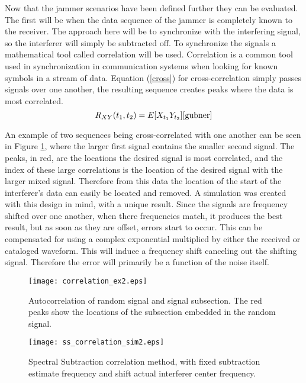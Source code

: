Now that the jammer scenarios have been defined further they can be evaluated.  The first will be when the data sequence of the jammer is completely known to the receiver.  The approach here will be to synchronize with the interfering signal, so the interferer will simply be subtracted off.  To synchronize the signals a mathematical tool called correlation will be used.  Correlation is a common tool used in synchronization in communication systems when looking for known symbols in a stream of data.  Equation (\ref{cross}) for cross-correlation simply passes signals over one another, the resulting sequence creates peaks where the data is most correlated.\\

\begin{equation}\label{cross}
R_{XY}(t_{1},t_{2})=E[X_{t_{1}}Y_{t_{2}}] \cite{gubner}
\end{equation}

An example of two sequences being cross-correlated with one another can be seen in Figure \ref{ss_correlation_ex}, where the larger first signal contains the smaller second signal. The peaks, in red, are the locations the desired signal is most correlated, and the index of these large correlations is the location of the desired signal with the larger mixed signal.  Therefore from this data the location of the start of the interferer's data can easily be located and removed.  A simulation was created with this design in mind, with a unique result.  Since the signals are frequency shifted over one another, when there frequencies match, it produces the best result, but as soon as they are offset, errors start to occur.  This can be compensated for using a complex exponential multiplied by either the received or cataloged waveform.  This will induce a frequency shift canceling out the shifting signal.  Therefore the error will primarily be a function of the noise itself.\\

\begin{figure}[!ht]\label{ss_correlation_ex}
\centering
\texttt{[image: correlation\_ex2.eps]}
\caption{Autocorrelation of random signal and signal subsection.  The red peaks show the locations of the subsection embedded in the random signal.}
\end{figure} 

\begin{figure}[!ht]\label{ss_correlation}
\centering
\texttt{[image: ss\_correlation\_sim2.eps]}
\caption{Spectral Subtraction correlation method, with fixed subtraction estimate frequency and shift actual interferer center frequency.}
\end{figure} 

